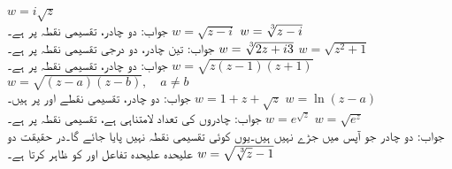 \quad
$w=i\sqrt{z}$\\
جواب:\quad 
دو چادر، تقسیمی نقطہ  پر ہے۔
\quad
$w=\sqrt{z-i}$
\quad
$w=\sqrt[\leftroot{-2}\uproot{2}3]{z-i}$\\
جواب:\quad
تین چادر، دو درجی  تقسیمی نقطہ  پر ہے۔
\quad
$w=\sqrt[\leftroot{-2}\uproot{2}3]{2z+i3}$
\quad
$w=\sqrt{z^2+1}$\\
جواب:\quad
دو چادر، تقسیمی نقطہ  پر ہے۔
\quad
$w=\sqrt{z(z-1)(z+1)}$
\quad
$w=\sqrt{(z-a)(z-b)},\quad a\ne b$\\
جواب:\quad
دو چادر، تقسیمی نقطے  اور   پر ہیں۔
\quad
$w=1+z+\sqrt{z}$
\quad
$w=\ln(z-a)$\\
جواب:\quad
چادروں کی تعداد لامتناہی ہے، تقسیمی نقطہ  پر ہے۔
\quad
$w=e^{\sqrt{z}}$
\quad
$w=\sqrt{e^z}$\\
جواب:\quad
دو چادر جو آپس میں جڑے نہیں ہیں۔یوں کوئی تقسیمی نقطہ نہیں پایا جائے گا۔در حقیقت  دو علیحدہ علیحدہ تفاعل  اور
  کو ظاہر کرتا ہے۔
\quad
$w=\sqrt{\sqrt[\leftroot{-2}\uproot{2}3]{z}-1}$
